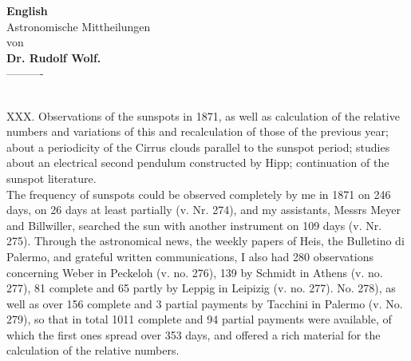 \documentclass[12pt]{article}
\begin{document}
{\centering
\textbf{English}\\
\huge{Astronomische Mittheilungen}\\
\footnotesize{von}\\
\textbf{Dr. Rudolf Wolf.}\\
----------\\
\par
}\\
\footnotesize{XXX. Observations of the sunspots in 1871, as well as calculation of the relative numbers and variations of this and recalculation of those of the previous year; about a periodicity of the Cirrus clouds parallel to the sunspot period; studies about an electrical second pendulum constructed by Hipp; continuation of the sunspot literature.}\\

The frequency of sunspots could be observed completely by me in 1871 on 246 days, on 26 days at least partially (v. Nr. 274), and my assistants, Messrs Meyer and Billwiller, searched the sun with another instrument on 109 days (v. Nr. 275). Through the astronomical news, the weekly papers of Heis, the Bulletino di Palermo, and grateful written communications, I also had 280 observations concerning Weber in Peckeloh (v. no. 276), 139 by Schmidt in Athens (v. no. 277), 81 complete and 65 partly by Leppig in Leipizig (v. no. 277). No. 278), as well as over 156 complete and 3 partial payments by Tacchini in Palermo (v. No. 279), so that in total 1011 complete and 94 partial payments were available, of which the first ones spread over 353 days, and offered a rich material for the calculation of the relative numbers.\\
\end{document}
